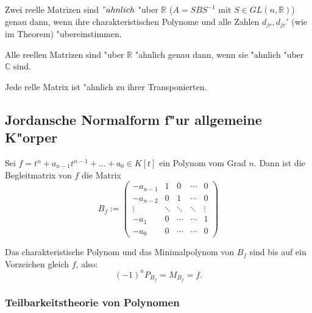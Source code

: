 \documentclass[11pt, a4paper]{article}
\begin{document}
\begin{corollary}
Zwei reelle Matrizen sind $"ahnlich$ "uber $\mathbb{R}$ ($A = S B S^{-1}$ mit $S \in GL(n, \mathbb{R})$) genau dann, wenn ihre charakteristischen Polynome und alle Zahlen $d_{jr}, d_{jr}'$ (wie im Theorem) "ubereinstimmen.
\end{corollary}

\begin{corollary}
Alle reellen Matrizen sind "uber $\mathbb{R}$ "ahnlich genau dann, wenn sie "ahnlich "uber $\mathbb{C}$ sind.
\end{corollary}
 
 
 \begin{corollary}
 Jede relle Matrix ist "ahnlich zu ihrer Transponierten. 
 \end{corollary}
 
 \subsection{Jordansche Normalform f"ur allgemeine K"orper}
 
 \begin{definition}
 Sei $f = t^n + a_{n-1}t^{n-1} + ... + a_0 \in K[t]$ ein Polynom vom Grad $n$. Dann ist die Begleitmatrix von $f$ die Matrix 
 $$
 B_{f}:=\left(\begin{array}{ccccc}-a_{n-1} & 1 & 0 & \cdots & 0 \\ -a_{n-2} & 0 & 1 & \cdots & 0 \\ \vdots & \ddots & \ddots & \ddots & \vdots \\ -a_{1} & 0 & \cdots & \cdots & 1 \\ -a_{0} & 0 & \cdots & \cdots & 0\end{array}\right)
 $$
 \end{definition}
 
 \begin{theorem}
 Das charakteristische Polynom und das Minimalpolynom von $B_f$ sind bis auf ein Vorzeichen gleich $f$, also:
 $$
 (-1)^n P_{B_f} = M_{B_f} = f.
 $$
 \end{theorem}
 
 \subsubsection{Teilbarkeitstheorie von Polynomen}
\end{document}

